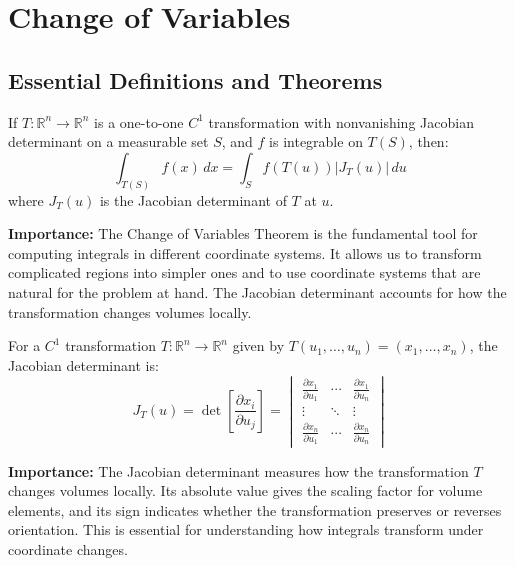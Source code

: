 \section{Change of Variables}

\subsection*{Essential Definitions and Theorems}

\begin{definition}
If $T: \mathbb{R}^n \to \mathbb{R}^n$ is a one-to-one $C^1$ transformation with nonvanishing Jacobian determinant on a measurable set $S$, and $f$ is integrable on $T(S)$, then:
\[\int_{T(S)} f(x) \, dx = \int_S f(T(u)) |J_T(u)| \, du\]
where $J_T(u)$ is the Jacobian determinant of $T$ at $u$.
\end{definition}

\noindent\textbf{Importance:} The Change of Variables Theorem is the fundamental tool for computing integrals in different coordinate systems. It allows us to transform complicated regions into simpler ones and to use coordinate systems that are natural for the problem at hand. The Jacobian determinant accounts for how the transformation changes volumes locally.



\begin{definition}
For a $C^1$ transformation $T: \mathbb{R}^n \to \mathbb{R}^n$ given by $T(u_1, \ldots, u_n) = (x_1, \ldots, x_n)$, the Jacobian determinant is:
\[J_T(u) = \det\left[\frac{\partial x_i}{\partial u_j}\right] = \begin{vmatrix}
\frac{\partial x_1}{\partial u_1} & \cdots & \frac{\partial x_1}{\partial u_n} \\
\vdots & \ddots & \vdots \\
\frac{\partial x_n}{\partial u_1} & \cdots & \frac{\partial x_n}{\partial u_n}
\end{vmatrix}\]
\end{definition}

\noindent\textbf{Importance:} The Jacobian determinant measures how the transformation $T$ changes volumes locally. Its absolute value gives the scaling factor for volume elements, and its sign indicates whether the transformation preserves or reverses orientation. This is essential for understanding how integrals transform under coordinate changes.



